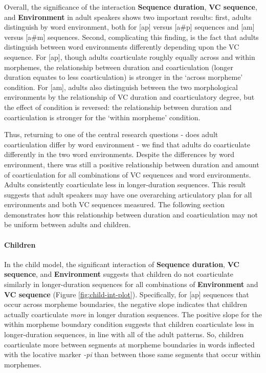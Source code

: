 \documentclass[
]{article}
\begin{document}
Overall, the significance of the interaction \textbf{Sequence duration}, \textbf{VC sequence}, and \textbf{Environment} in adult speakers shows two important results: first, adults distinguish by word environment, both for {[}ap{]} versus {[}a\#p{]} sequences and {[}am{]} versus {[}a\#m{]} sequences. Second, complicating this finding, is the fact that adults distinguish between word environments differently depending upon the VC sequence. For {[}ap{]}, though adults coarticulate roughly equally across and within morphemes, the relationship between duration and coarticulation (longer duration equates to less coarticulation) is stronger in the `across morpheme' condition. For {[}am{]}, adults also distinguish between the two morphological environments by the relationship of VC duration and coarticulatory degree, but the effect of condition is reversed: the relationship between duration and coarticulation is stronger for the `within morpheme' condition.

Thus, returning to one of the central research questions - does adult coarticulation differ by word environment - we find that adults do coarticulate differently in the two word environments. Despite the differences by word environment, there was still a positive relationship between duration and amount of coarticulation for all combinations of VC sequences and word environments. Adults consistently coarticulate less in longer-duration sequences. This result suggests that adult speakers may have one overarching articulatory plan for all environments and both VC sequences measured. The following section demonstrates how this relationship between duration and coarticulation may not be uniform between adults and children.

\hypertarget{children}{%
\paragraph{Children}\label{children}}

In the child model, the significant interaction of \textbf{Sequence duration}, \textbf{VC sequence}, and \textbf{Environment} suggests that children do not coarticulate similarly in longer-duration sequences for all combinations of \textbf{Environment} and \textbf{VC sequence} (Figure \ref{fig:child-int-plot}). Specifically, for {[}ap{]} sequences that occur across morpheme boundaries, the negative slope indicates that children actually coarticulate \emph{more} in longer duration sequences. The positive slope for the within morpheme boundary condition suggests that children coarticulate less in longer-duration sequences, in line with all of the adult patterns. So, children coarticulate more between segments at morpheme boundaries in words inflected with the locative marker \emph{-pi} than between those same segments that occur within morphemes.
\end{document}
